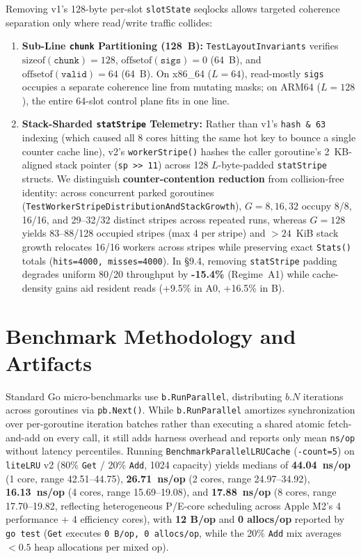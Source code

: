 \documentclass[11pt,a4paper]{article}
\begin{document}
Removing v1's 128-byte per-slot \texttt{slotState} seqlocks allows targeted coherence separation only where read/write traffic collides:
\begin{enumerate}
    \item \textbf{Sub-Line \texttt{chunk} Partitioning (128~B):} \texttt{TestLayoutInvariants} verifies $\text{sizeof}(\texttt{chunk})=128$, $\text{offsetof}(\texttt{sigs})=0$ (64~B), and $\text{offsetof}(\texttt{valid})=64$ (64~B). On x86\_64 ($L=64$), read-mostly \texttt{sigs} occupies a separate coherence line from mutating masks; on ARM64 ($L=128$), the entire 64-slot control plane fits in one line.
    \item \textbf{Stack-Sharded \texttt{statStripe} Telemetry:} Rather than v1's \texttt{hash \& 63} indexing (which caused all 8 cores hitting the same hot key to bounce a single counter cache line), v2's \texttt{workerStripe()} hashes the caller goroutine's 2~KB-aligned stack pointer (\texttt{sp >> 11}) across 128 $L$-byte-padded \texttt{statStripe} structs. We distinguish \textbf{counter-contention reduction} from collision-free identity: across concurrent parked goroutines (\texttt{TestWorkerStripeDistributionAndStackGrowth}), $G=8, 16, 32$ occupy 8/8, 16/16, and 29--32/32 distinct stripes across repeated runs, whereas $G=128$ yields 83--88/128 occupied stripes (max 4 per stripe) and $>24$~KiB stack growth relocates 16/16 workers across stripes while preserving exact \texttt{Stats()} totals (\texttt{hits=4000, misses=4000}). In \S 9.4, removing \texttt{statStripe} padding degrades uniform 80/20 throughput by \textbf{-15.4\%} (Regime~A1) while cache-density gains aid resident reads (+9.5\% in A0, +16.5\% in B).
\end{enumerate}

\section{Benchmark Methodology and Artifacts}

Standard Go micro-benchmarks use \texttt{b.RunParallel}, distributing $b.N$ iterations across goroutines via \texttt{pb.Next()}. While \texttt{b.RunParallel} amortizes synchronization over per-goroutine iteration batches rather than executing a shared atomic fetch-and-add on every call, it still adds harness overhead and reports only mean \texttt{ns/op} without latency percentiles. Running \texttt{BenchmarkParallelLRUCache} (\texttt{-count=5}) on \texttt{liteLRU} v2 (80\% \texttt{Get} / 20\% \texttt{Add}, 1024 capacity) yields medians of \textbf{44.04~ns/op} (1 core, range 42.51--44.75), \textbf{26.71~ns/op} (2 cores, range 24.97--34.92), \textbf{16.13~ns/op} (4 cores, range 15.69--19.08), and \textbf{17.88~ns/op} (8 cores, range 17.70--19.82, reflecting heterogeneous P/E-core scheduling across Apple M2's 4 performance + 4 efficiency cores), with \textbf{12 B/op} and \textbf{0 allocs/op} reported by \texttt{go test} (\texttt{Get} executes \texttt{0 B/op, 0 allocs/op}, while the 20\% \texttt{Add} mix averages $<0.5$ heap allocations per mixed op).
\end{document}
